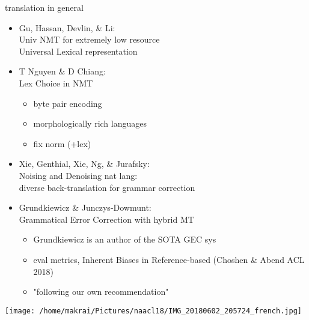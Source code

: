 \documentclass{beamer}
\begin{document}
\begin{frame}{translation in general}
  \begin{itemize}
    \item Gu, Hassan, Devlin, \& Li: \\  Univ NMT for extremely low resource 
      \\ Universal Lexical representation
    \item T Nguyen \& D Chiang: \\  Lex Choice in NMT 
      \begin{itemize}
        \item byte pair encoding 
        \item morphologically rich languages
        \item fix norm (+lex)
      \end{itemize}
    \item Xie, Genthial, Xie, Ng, \& Jurafsky: \\  Noising and Denoising nat
      lang: \\
      diverse back-translation for grammar correction
    \item Grundkiewicz \& Junczys-Dowmunt: \\  Grammatical Error Correction with hybrid MT
      \begin{itemize}
        \item Grundkiewicz is an author of the SOTA GEC sys
        \item eval metrics, Inherent Biases in Reference-based (Choshen \& Abend ACL 2018)
        \item "following our own recommendation"
      \end{itemize}
  \end{itemize}
\end{frame}

\begin{frame}
  \texttt{[image: /home/makrai/Pictures/naacl18/IMG\_20180602\_205724\_french.jpg]}
\end{frame}
\end{document}
